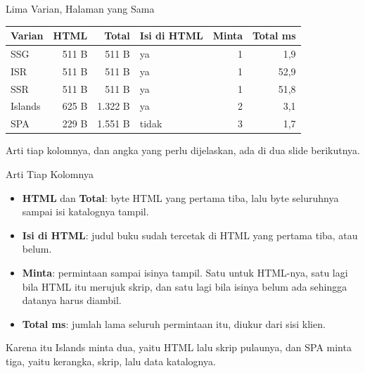 \documentclass[aspectratio=169, table, 12pt]{beamer}
\begin{document}
\begin{frame}{{\Large Lima Varian, Halaman yang Sama}}
  \vspace{6pt}
  \centering
  {\footnotesize
  \begin{tabularx}{\textwidth}{lrrlrr}
    \hline
    \textbf{Varian} & \textbf{HTML} & \textbf{Total} & \textbf{Isi di HTML} & \textbf{Minta} & \textbf{Total ms} \\
    \hline
    SSG & 511 B & 511 B & ya & 1 & 1,9 \\
    \hline
    ISR & 511 B & 511 B & ya & 1 & 52,9 \\
    \hline
    SSR & 511 B & 511 B & ya & 1 & 51,8 \\
    \hline
    Islands & 625 B & 1.322 B & ya & 2 & 3,1 \\
    \hline
    SPA & 229 B & 1.551 B & tidak & 3 & 1,7 \\
    \hline
  \end{tabularx}}

  \vspace{6pt}
  {\footnotesize Arti tiap kolomnya, dan angka yang perlu dijelaskan, ada di
  dua slide berikutnya.}
\end{frame}

\begin{frame}{{\Large Arti Tiap Kolomnya}}
  \vspace{10pt}
  \begin{itemize}
    \item \textbf{HTML} dan \textbf{Total}: byte HTML yang pertama tiba, lalu
          byte seluruhnya sampai isi katalognya tampil.
    \item \textbf{Isi di HTML}: judul buku sudah tercetak di HTML yang
          pertama tiba, atau belum.
    \item \textbf{Minta}: permintaan sampai isinya tampil. Satu untuk
          HTML-nya, satu lagi bila HTML itu merujuk skrip, dan satu lagi bila
          isinya belum ada sehingga datanya harus diambil.
    \item \textbf{Total ms}: jumlah lama seluruh permintaan itu, diukur dari
          sisi klien.
  \end{itemize}
  \vspace{6pt}
  {\small Karena itu Islands minta dua, yaitu HTML lalu skrip pulaunya, dan
  SPA minta tiga, yaitu kerangka, skrip, lalu data katalognya.}
\end{frame}
\end{document}
